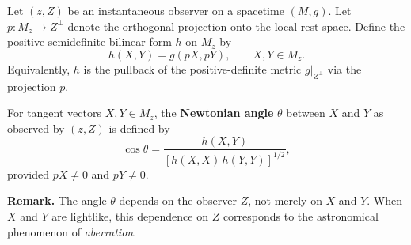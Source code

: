 Let $(z, Z)$ be an instantaneous observer on a spacetime $(M, g)$. Let $p: M_z \to Z^\perp$ denote the orthogonal projection onto the local rest space. Define the positive-semidefinite bilinear form $h$ on $M_z$ by
$$h(X, Y) = g(pX, pY), \qquad X, Y \in M_z.$$
Equivalently, $h$ is the pullback of the positive-definite metric $g|_{Z^\perp}$ via the projection $p$.

For tangent vectors $X, Y \in M_z$, the \textbf{Newtonian angle} $\theta$ between $X$ and $Y$ as observed by $(z, Z)$ is defined by
$$\cos \theta = \frac{h(X, Y)}{[h(X, X)\,h(Y, Y)]^{1/2}},$$
provided $pX \neq 0$ and $pY \neq 0$.

\textbf{Remark.} The angle $\theta$ depends on the observer $Z$, not merely on $X$ and $Y$. When $X$ and $Y$ are lightlike, this dependence on $Z$ corresponds to the astronomical phenomenon of \textit{aberration}.
